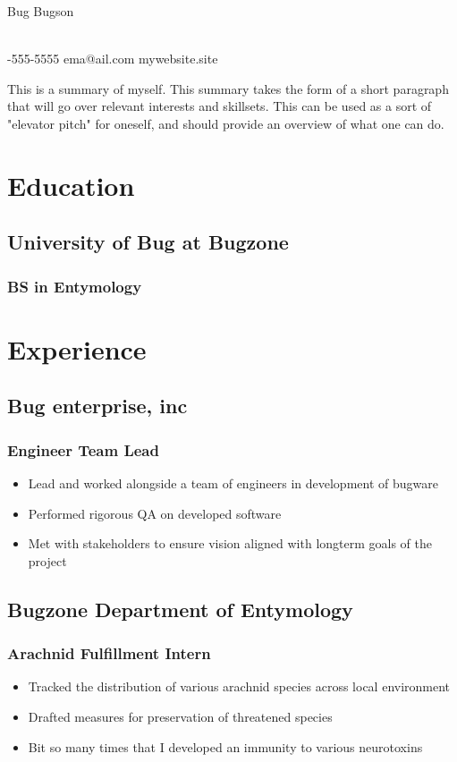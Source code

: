 \documentclass[11pt]{article}
\begin{document}
\begin{center}
{
\fontsize{36}{12}
 \selectfont

\color{accent} Bug Bugson
} \\-555-5555 \quad
ema@ail.com \quad
mywebsite.site \quad
\end{center}
This is a summary of myself. This summary takes the form of a short paragraph that will go over relevant interests and skillsets. This can be used as a sort of "elevator pitch" for oneself, and should provide an overview of what one can do.\newline
\section{Education}
\subsection{University of Bug at Bugzone}
\subsubsection{BS in Entymology
}
\section{Experience}
\subsection{Bug enterprise, inc
}
\subsubsection{Engineer Team Lead
}
\begin{itemize}
\item Lead and worked alongside a team of engineers in development of bugware
\item Performed rigorous QA on developed software
\item Met with stakeholders to ensure vision aligned with longterm goals of the project
\end{itemize}
\subsection{Bugzone Department of Entymology
}
\subsubsection{Arachnid Fulfillment Intern
}
\begin{itemize}
\item Tracked the distribution of various arachnid species across local environment
\item Drafted measures for preservation of threatened species
\item Bit so many times that I developed an immunity to various neurotoxins
\end{itemize}
\end{document}
